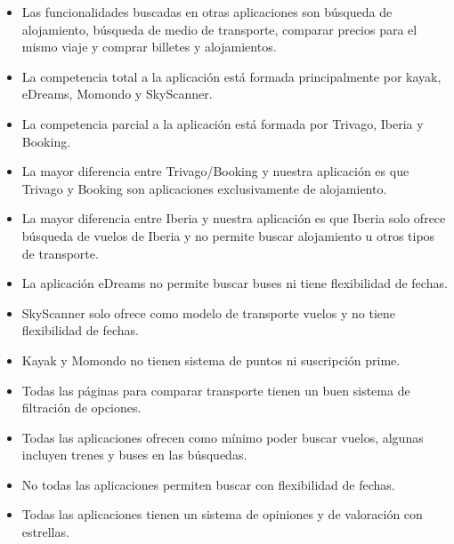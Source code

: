 \begin{itemize}
    \item Las funcionalidades buscadas en otras aplicaciones son búsqueda de alojamiento, búsqueda de medio de transporte, comparar precios para el mismo viaje y comprar billetes y alojamientos.
    \item La competencia total a la aplicación está formada principalmente por kayak, eDreams, Momondo y SkyScanner.
    \item La competencia parcial a la aplicación está formada por Trivago, Iberia y Booking.
    \item La mayor diferencia entre Trivago/Booking y nuestra aplicación es que Trivago y Booking son aplicaciones exclusivamente de alojamiento.
    \item La mayor diferencia entre Iberia y nuestra aplicación es que Iberia solo ofrece búsqueda de vuelos de Iberia y no permite buscar alojamiento u otros tipos de transporte.
    \item La aplicación eDreams no permite buscar buses ni tiene flexibilidad de fechas.
    \item SkyScanner solo ofrece como modelo de transporte vuelos y no tiene flexibilidad de fechas.
    \item Kayak y Momondo no tienen sistema de puntos ni suscripción prime.
    \item Todas las páginas para comparar transporte tienen un buen sistema de filtración de opciones.
    \item Todas las aplicaciones ofrecen como mínimo poder buscar vuelos, algunas incluyen trenes y buses en las búsquedas.
    \item No todas las aplicaciones permiten buscar con flexibilidad de fechas.
    \item Todas las aplicaciones tienen un sistema de opiniones y de valoración con estrellas.
\end{itemize}
